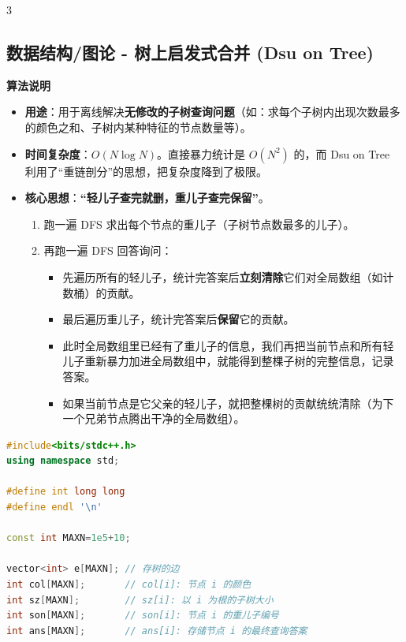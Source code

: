 \documentclass[10pt,landscape,a4paper]{article}
\begin{document}
\begin{multicols*}{3}
\subsection*{数据结构/图论 - 树上启发式合并 (Dsu on Tree)}
\par\addvspace{0.7ex}\noindent\textbf{算法说明}\par\nobreak
\begin{itemize}
\item \textbf{用途}：用于离线解决\textbf{无修改的子树查询问题}（如：求每个子树内出现次数最多的颜色之和、子树内某种特征的节点数量等）。
\item \textbf{时间复杂度}：$O(N \log N)$。直接暴力统计是 $O(N^2)$ 的，而 Dsu on Tree 利用了“重链剖分”的思想，把复杂度降到了极限。
\item \textbf{核心思想}：\textbf{“轻儿子查完就删，重儿子查完保留”}。
\begin{enumerate}[start=1]
\item 跑一遍 DFS 求出每个节点的重儿子（子树节点数最多的儿子）。
\item 再跑一遍 DFS 回答询问：
\begin{itemize}
\item 先遍历所有的轻儿子，统计完答案后\textbf{立刻清除}它们对全局数组（如计数桶）的贡献。
\item 最后遍历重儿子，统计完答案后\textbf{保留}它的贡献。
\item 此时全局数组里已经有了重儿子的信息，我们再把当前节点和所有轻儿子重新暴力加进全局数组中，就能得到整棵子树的完整信息，记录答案。
\item 如果当前节点是它父亲的轻儿子，就把整棵树的贡献统统清除（为下一个兄弟节点腾出干净的全局数组）。
\end{itemize}
\end{enumerate}
\end{itemize}
\par{}\par
\begin{lstlisting}[language=C++]
#include<bits/stdc++.h>
using namespace std;

#define int long long
#define endl '\n'

const int MAXN=1e5+10;

vector<int> e[MAXN]; // 存树的边
int col[MAXN];       // col[i]: 节点 i 的颜色
int sz[MAXN];        // sz[i]: 以 i 为根的子树大小
int son[MAXN];       // son[i]: 节点 i 的重儿子编号
int ans[MAXN];       // ans[i]: 存储节点 i 的最终查询答案


\end{lstlisting}
\end{multicols*}
\end{document}
